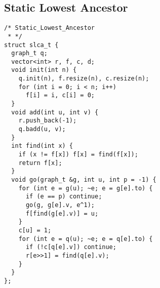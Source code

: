 \subsection{Static Lowest Ancestor}
\begin{lstlisting}
/* Static_Lowest_Ancestor
 * */
struct slca_t {
  graph_t q;
  vector<int> r, f, c, d;
  void init(int n) {
    q.init(n), f.resize(n), c.resize(n);
    for (int i = 0; i < n; i++)
      f[i] = i, c[i] = 0;
  }
  void add(int u, int v) {
    r.push_back(-1);
    q.badd(u, v);
  }
  int find(int x) {
    if (x != f[x]) f[x] = find(f[x]);
    return f[x];
  }
  void go(graph_t &g, int u, int p = -1) {
    for (int e = g(u); ~e; e = g[e].to) {
      if (e == p) continue;
      go(g, g[e].v, e^1);
      f[find(g[e].v)] = u;
    }
    c[u] = 1;
    for (int e = q(u); ~e; e = q[e].to) {
      if (!c[q[e].v]) continue;
      r[e>>1] = find(q[e].v);
    }
  }
};
\end{lstlisting}


